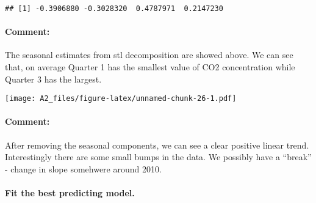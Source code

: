 \documentclass[]{article}
\newenvironment{Shaded}{\begin{snugshade}}{\end{snugshade}}
\newcommand{\CommentTok}[1]{\textcolor[rgb]{0.56,0.35,0.01}{\textit{#1}}}
\newcommand{\DataTypeTok}[1]{\textcolor[rgb]{0.13,0.29,0.53}{#1}}
\newcommand{\DecValTok}[1]{\textcolor[rgb]{0.00,0.00,0.81}{#1}}
\newcommand{\KeywordTok}[1]{\textcolor[rgb]{0.13,0.29,0.53}{\textbf{#1}}}
\newcommand{\NormalTok}[1]{#1}
\newcommand{\OperatorTok}[1]{\textcolor[rgb]{0.81,0.36,0.00}{\textbf{#1}}}
\newcommand{\StringTok}[1]{\textcolor[rgb]{0.31,0.60,0.02}{#1}}
\let\oldparagraph\paragraph
\renewcommand{\paragraph}[1]{\oldparagraph{#1}\mbox{}}
\begin{document}
\begin{Shaded}
\end{Shaded}

\begin{verbatim}
## [1] -0.3906880 -0.3028320  0.4787971  0.2147230
\end{verbatim}

\hypertarget{comment-1}{%
\paragraph{Comment:}\label{comment-1}}

The seasonal estimates from stl decomposition are showed above. We can
see that, on average Quarter 1 has the smallest value of CO2
concentration while Quarter 3 has the largest.

\begin{Shaded}
\end{Shaded}

\texttt{[image: A2\_files/figure-latex/unnamed-chunk-26-1.pdf]}

\hypertarget{comment-2}{%
\paragraph{Comment:}\label{comment-2}}

After removing the seasonal components, we can see a clear positive
linear trend. Interestingly there are some small bumps in the data. We
possibly have a ``break'' - change in slope somehwere around 2010.

\hypertarget{fit-the-best-predicting-model.}{%
\paragraph{Fit the best predicting
model.}\label{fit-the-best-predicting-model.}}
\end{document}
